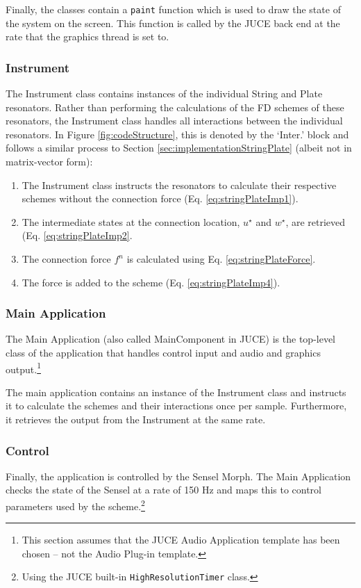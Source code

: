 Finally, the classes contain a \texttt{paint} function which is used to draw the state of the system on the screen. This function is called by the JUCE back end at the rate that the graphics thread is set to.

\subsubsection{Instrument}
The Instrument class contains instances of the individual String and Plate resonators. Rather than performing the calculations of the FD schemes of these resonators, the Instrument class handles all interactions between the individual resonators. In Figure \ref{fig:codeStructure}, this is denoted by the `Inter.' block and follows a similar process to Section \ref{sec:implementationStringPlate} (albeit not in matrix-vector form):
\begin{enumerate}
    \item The Instrument class instructs the resonators to calculate their respective schemes without the connection force (Eq. \eqref{eq:stringPlateImp1}).
    \item The intermediate states at the connection location, $u^\star$ and $w^\star$, are retrieved (Eq. \eqref{eq:stringPlateImp2}.
    \item The connection force $f^n$ is calculated using Eq. \eqref{eq:stringPlateForce}.
    \item The force is added to the scheme (Eq. \eqref{eq:stringPlateImp4}).
\end{enumerate}

\subsubsection{Main Application}
The Main Application (also called MainComponent in JUCE) is the top-level class of the application that handles control input and audio and graphics output.\footnote{This section assumes that the JUCE Audio Application template has been chosen -- not the Audio Plug-in template.}

The main application contains an instance of the Instrument class and instructs it to calculate the schemes and their interactions once per sample. Furthermore, it retrieves the output from the Instrument at the same rate.


\subsubsection{Control}
Finally, the application is controlled by the Sensel Morph. The Main Application checks the state of the Sensel at a rate of 150 Hz and maps this to control parameters used by the scheme.\footnote{Using the JUCE built-in \texttt{HighResolutionTimer} class.}


